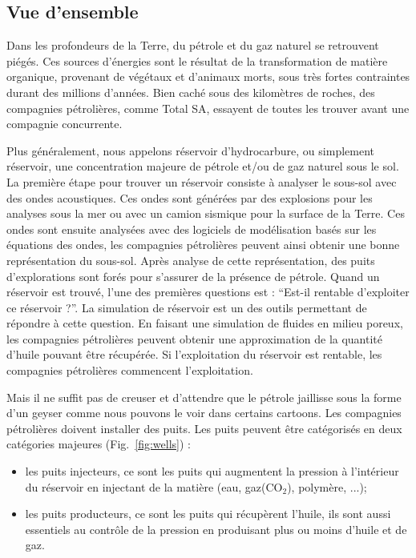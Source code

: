 \subsection{Vue d'ensemble}
Dans les profondeurs de la Terre, du pétrole et du gaz naturel se retrouvent piégés.
%
Ces sources d'énergies sont le résultat de la transformation de matière organique, provenant de végétaux et d'animaux morts, sous très fortes contraintes durant des millions d'années.
%
Bien caché sous des kilomètres de roches, des compagnies pétrolières, comme Total SA, essayent de toutes les trouver avant une compagnie concurrente.


Plus généralement, nous appelons réservoir d'hydrocarbure, ou simplement réservoir, une concentration majeure de pétrole et/ou de gaz naturel sous le sol.
%
La première étape pour trouver un réservoir consiste à analyser le sous-sol avec des ondes acoustiques.
%
Ces ondes sont générées par des explosions pour les analyses sous la mer ou avec un camion sismique pour la surface de la Terre.
%
Ces ondes sont ensuite analysées avec des logiciels de modélisation basés sur les équations des ondes, les compagnies pétrolières peuvent ainsi obtenir une bonne représentation du sous-sol.
%
Après analyse de cette représentation, des puits d'explorations sont forés pour s'assurer de la présence de pétrole.
%
Quand un réservoir est trouvé, l'une des premières questions est : ``Est-il rentable d'exploiter ce réservoir ?''.
%
La simulation de réservoir est un des outils permettant de répondre à cette question.
%
En faisant une simulation de fluides en milieu poreux, les compagnies pétrolières peuvent obtenir une approximation de la quantité d'huile pouvant être récupérée.
%
Si l'exploitation du réservoir est rentable, les compagnies pétrolières commencent l'exploitation.


Mais il ne suffit pas de creuser et d'attendre que le pétrole jaillisse sous la forme d'un geyser comme nous pouvons le voir dans certains cartoons.
%
Les compagnies pétrolières doivent installer des puits.
%
Les puits peuvent être catégorisés en deux catégories majeures (Fig.~\ref{fig:wells}) :
%
\begin{itemize}
  \item les puits injecteurs, ce sont les puits qui augmentent la pression à l'intérieur du réservoir en injectant de la matière (eau, gaz(CO$_2$), polymère, ...);
  \item les puits producteurs, ce sont les puits qui récupèrent l'huile, ils sont aussi essentiels au contrôle de la pression en produisant plus ou moins d'huile et de gaz.
\end{itemize}

